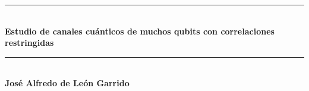 \documentclass[11pt, spanish, letterpage]{article}
\date{}
\begin{document}
\begin{titlepage} %
        \newcommand{\HRule}{\rule{\linewidth}{0.5mm}} %

        \center %
        

        \HRule\\[0.4cm]

        {\huge\bfseries Estudio de canales cuánticos de muchos qubits con correlaciones restringidas}\\[0.4cm] %

        \HRule\\[2cm]
        


		\Large{\textbf{José Alfredo de León Garrido}}\\ [2cm] %



\end{titlepage}
\end{document}
